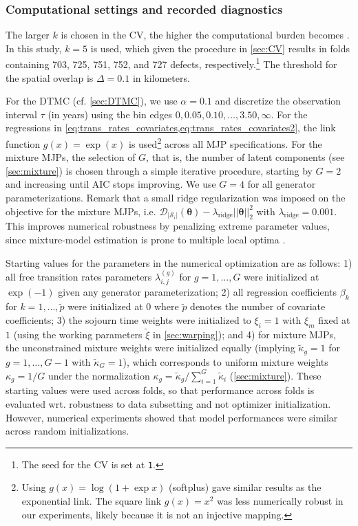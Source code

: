 \subsubsection{Computational settings and recorded diagnostics} \label{sec:CV_details}
The larger $k$ is chosen in the CV, the higher the computational burden becomes \citep{fushiki2011a}. In this study, $k=5$ is used, which given the procedure in \cref{sec:CV} results in folds containing \num{703}, \num{725}, \num{751}, \num{752}, and \num{727} defects, respectively.\footnote{The seed for the CV is set at \texttt{1}.} The threshold for the spatial overlap is $\Delta = 0.1$ in kilometers.

For the DTMC (cf. \cref{sec:DTMC}), we use $\alpha=0.1$ and discretize the observation interval $\tau$ (in years) using the bin edges
$
0,0.05,0.10,\dots,3.50,\infty
$.
For the regressions in \cref{eq:trans_rates_covariates,eq:trans_rates_covariates2}, the link function $g(x) = \exp(x)$ is used\footnote{Using $g(x)=\log(1+\exp x)$ (softplus) gave similar results as the exponential link. The square link $g(x)=x^2$ was less numerically robust in our experiments, likely because it is not an injective mapping.} across all MJP specifications.
For the mixture MJPs, the selection of $G$, that is, the number of latent components (see \cref{sec:mixture}) is chosen through a simple iterative procedure, starting by $G=2$ and increasing until AIC stops improving. We use $G = 4$ for all generator parameterizations. Remark that a small ridge regularization was imposed on the objective for the mixture MJPs, i.e. $\mathcal D_{|\mathcal S_i|} (\bm \theta) - \lambda_{\text{ridge}} ||\bm \theta||_{2}^2$ with $\lambda_{\text{ridge}} = 0.001$.  This improves numerical robustness by penalizing extreme parameter values, since mixture-model estimation is prone to multiple local optima \citep{shireman2016a}.

Starting values for the parameters in the numerical optimization are as follows: 1) all free transition rates parameters $\lambda_{i,j}^{(g)}$ for $g = 1,\dots,G$ were initialized at $\exp(-1)$ given any generator parameterization; 2) all regression coefficients $ \beta_k$ for $ k = 1,\dots, \widetilde{p}$ were initialized at $0$ where $\widetilde{p}$ denotes the number of covariate coefficients; 3) the sojourn time weights were initialized to $\xi_i=1$ with $\xi_m$ fixed at $1$ (using the working parameters $\widetilde \xi$ in \cref{sec:warping}); and 4) for mixture MJPs, the unconstrained mixture weights were initialized equally (implying $\tilde\kappa_g = 1$ for $g=1,\dots,G-1$ with $\tilde\kappa_G=1$), which corresponds to uniform mixture weights $\kappa_g = 1/G$ under the normalization $\kappa_g=\tilde\kappa_g/\sum_{i=1}^G \tilde\kappa_i $ (\cref{sec:mixture}).  
These starting values were used across folds, so that performance across folds is evaluated wrt. robustness to data subsetting and not optimizer initialization. However, numerical experiments showed that model performances were similar across random initializations.

